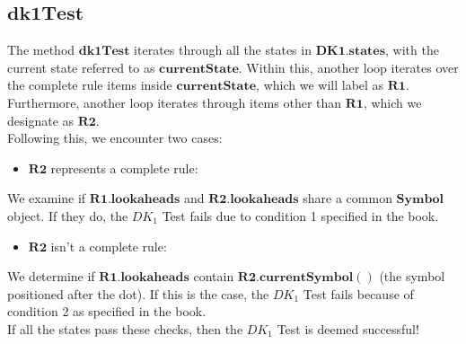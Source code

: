 \vspace{20pt}

\subsection{\(\boldsymbol{dk1Test}\)}

The method \(\boldsymbol{dk1Test}\) iterates through all the states in \(\boldsymbol{DK1.states}\), with the current state referred to as \(\boldsymbol{currentState}\). Within this, another loop iterates over the complete rule items inside \(\boldsymbol{currentState}\), which we will label as \(\boldsymbol{R1}\). Furthermore, another loop iterates through items other than \(\boldsymbol{R1}\), which we designate as \(\boldsymbol{R2}\).\\

Following this, we encounter two cases:
\begin{itemize}
    \item \(\boldsymbol{R2}\) represents a complete rule:
\end{itemize}

We examine if \(\boldsymbol{R1.lookaheads}\) and \(\boldsymbol{R2.lookaheads}\) share a common \(\boldsymbol{Symbol}\) object. If they do, the \(DK_{1}\) Test fails due to condition 1 specified in the book.

\begin{itemize}
    \item \(\boldsymbol{R2}\) isn't a complete rule:
\end{itemize}

We determine if \(\boldsymbol{R1.lookaheads}\) contain \(\boldsymbol{R2.currentSymbol()}\) (the symbol positioned after the dot). If this is the case, the \(DK_{1}\) Test fails because of condition 2 as specified in the book.\\

If all the states pass these checks, then the \(DK_{1}\) Test is deemed successful!\\

